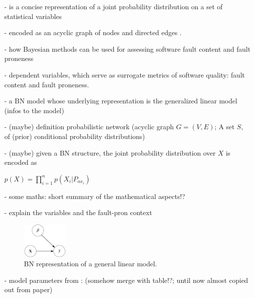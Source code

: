 - is a concise representation of a joint probability distribution on a set of statistical variables

- encoded as an acyclic graph of nodes and directed edges \cite{b9pai2007empirical}. 

- how Bayesian methods can be used for assessing software fault content and fault proneness

- dependent variables, which serve as surrogate metrics of software quality: fault content and fault proneness.

- a BN model whose underlying representation is the generalized linear model (infos to the model)

- (maybe) definition probabilistic network (acyclic graph $G=(V,E)$; A set $S$, of (prior) conditional probability distributions)

- (maybe) given a BN structure, the joint probability distribution over $X$ is encoded as

\begin{math}
	p(X)= \prod_{i=1}^{n}p(X_i|P_{ax_i})
\end{math}

- some maths: short summary of the mathematical aspects!?

- explain the variables and the fault-pron context

\begin{figure}[htbp]
	\centerline{\includegraphics[width=0.2\textwidth]{pictures/bn1.png}}
	\caption{BN representation of a general linear model.}
	\label{fig1bn}
\end{figure}

- model parameters from \cite{b9pai2007empirical}: (somehow merge with table!?; until now almost copied out from paper)

